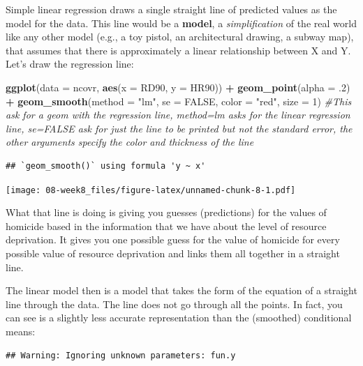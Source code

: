 \documentclass[]{book}
\newenvironment{Shaded}{\begin{snugshade}}{\end{snugshade}}
\newcommand{\CommentTok}[1]{\textcolor[rgb]{0.56,0.35,0.01}{\textit{#1}}}
\newcommand{\DataTypeTok}[1]{\textcolor[rgb]{0.13,0.29,0.53}{#1}}
\newcommand{\DecValTok}[1]{\textcolor[rgb]{0.00,0.00,0.81}{#1}}
\newcommand{\FloatTok}[1]{\textcolor[rgb]{0.00,0.00,0.81}{#1}}
\newcommand{\KeywordTok}[1]{\textcolor[rgb]{0.13,0.29,0.53}{\textbf{#1}}}
\newcommand{\NormalTok}[1]{#1}
\newcommand{\OperatorTok}[1]{\textcolor[rgb]{0.81,0.36,0.00}{\textbf{#1}}}
\newcommand{\OtherTok}[1]{\textcolor[rgb]{0.56,0.35,0.01}{#1}}
\newcommand{\StringTok}[1]{\textcolor[rgb]{0.31,0.60,0.02}{#1}}
\begin{document}
Simple linear regression draws a single straight line of predicted values as the model for the data. This line would be a \textbf{model}, a \emph{simplification} of the real world like any other model (e.g., a toy pistol, an architectural drawing, a subway map), that assumes that there is approximately a linear relationship between X and Y. Let's draw the regression line:

\begin{Shaded}
\begin{Highlighting}[]
\KeywordTok{ggplot}\NormalTok{(}\DataTypeTok{data =}\NormalTok{ ncovr, }\KeywordTok{aes}\NormalTok{(}\DataTypeTok{x =}\NormalTok{ RD90, }\DataTypeTok{y =}\NormalTok{ HR90)) }\OperatorTok{+}
\StringTok{  }\KeywordTok{geom_point}\NormalTok{(}\DataTypeTok{alpha =} \FloatTok{.2}\NormalTok{) }\OperatorTok{+}
\StringTok{  }\KeywordTok{geom_smooth}\NormalTok{(}\DataTypeTok{method =} \StringTok{"lm"}\NormalTok{, }\DataTypeTok{se =} \OtherTok{FALSE}\NormalTok{, }\DataTypeTok{color =} \StringTok{"red"}\NormalTok{, }\DataTypeTok{size =} \DecValTok{1}\NormalTok{) }\CommentTok{#This ask for a geom with the regression line, method=lm asks for the linear regression line, se=FALSE ask for just the line to be printed but not the standard error, the other arguments specify the color and thickness of the line}
\end{Highlighting}
\end{Shaded}

\begin{verbatim}
## `geom_smooth()` using formula 'y ~ x'
\end{verbatim}

\texttt{[image: 08-week8\_files/figure-latex/unnamed-chunk-8-1.pdf]}

What that line is doing is giving you guesses (predictions) for the values of homicide based in the information that we have about the level of resource deprivation. It gives you one possible guess for the value of homicide for every possible value of resource deprivation and links them all together in a straight line.

The linear model then is a model that takes the form of the equation of a straight line through the data. The line does not go through all the points. In fact, you can see is a slightly less accurate representation than the (smoothed) conditional means:

\begin{verbatim}
## Warning: Ignoring unknown parameters: fun.y
\end{verbatim}
\end{document}

